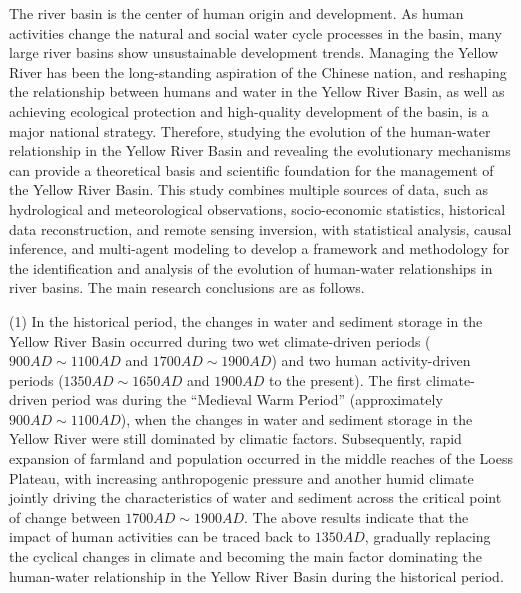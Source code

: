 \begin{eabstract}
  The river basin is the center of human origin and development. As human activities change the natural and social water cycle processes in the basin, many large river basins show unsustainable development trends. Managing the Yellow River has been the long-standing aspiration of the Chinese nation, and reshaping the relationship between humans and water in the Yellow River Basin, as well as achieving ecological protection and high-quality development of the basin, is a major national strategy. Therefore, studying the evolution of the human-water relationship in the Yellow River Basin and revealing the evolutionary mechanisms can provide a theoretical basis and scientific foundation for the management of the Yellow River Basin. This study combines multiple sources of data, such as hydrological and meteorological observations, socio-economic statistics, historical data reconstruction, and remote sensing inversion, with statistical analysis, causal inference, and multi-agent modeling to develop a framework and methodology for the identification and analysis of the evolution of human-water relationships in river basins. The main research conclusions are as follows.

  (1) In the historical period, the changes in water and sediment storage in the Yellow River Basin occurred during two wet climate-driven periods ($900AD\sim1100AD$ and $1700AD\sim1900AD$) and two human activity-driven periods ($1350AD \sim 1650AD$ and $1900AD$ to the present). The first climate-driven period was during the ``Medieval Warm Period'' (approximately $900AD \sim 1100AD$), when the changes in water and sediment storage in the Yellow River were still dominated by climatic factors. Subsequently, rapid expansion of farmland and population occurred in the middle reaches of the Loess Plateau, with increasing anthropogenic pressure and another humid climate jointly driving the characteristics of water and sediment across the critical point of change between $1700AD \sim 1900AD$. The above results indicate that the impact of human activities can be traced back to $1350AD$, gradually replacing the cyclical changes in climate and becoming the main factor dominating the human-water relationship in the Yellow River Basin during the historical period.


\end{eabstract}
